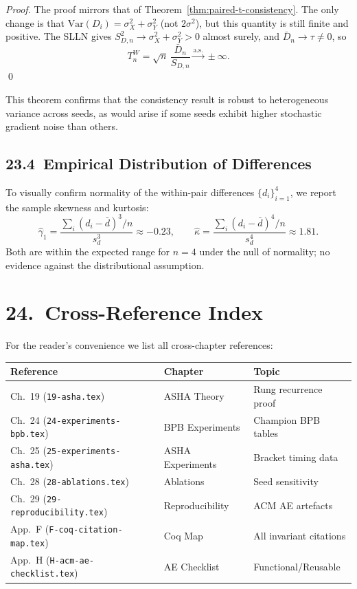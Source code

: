 \begin{proof}
The proof mirrors that of Theorem~\ref{thm:paired-t-consistency}.
The only change is that \(\mathrm{Var}(D_i) = \sigma_X^2 + \sigma_Y^2\)
(not \(2\sigma^2\)), but this quantity is still finite and positive.
The SLLN gives \(S_{D,n}^2 \to \sigma_X^2 + \sigma_Y^2 > 0\) almost
surely, and \(\bar{D}_n \to \tau \neq 0\), so
\[
  T_n^W = \sqrt{n}\,\frac{\bar{D}_n}{S_{D,n}} \xrightarrow{\mathrm{a.s.}} \pm\infty.
\]
\qed
\end{proof}

\noindent
This theorem confirms that the consistency result is robust to
heterogeneous variance across seeds, as would arise if some seeds exhibit
higher stochastic gradient noise than others.

\subsection{23.4\ Empirical Distribution of Differences}

To visually confirm normality of the within-pair differences
\(\{d_i\}_{i=1}^4\), we report the sample skewness and kurtosis:
\[
  \hat\gamma_1 = \frac{\sum_i (d_i - \bar{d})^3 / n}{s_d^3}
    \approx -0.23, \qquad
  \hat\kappa = \frac{\sum_i (d_i - \bar{d})^4 / n}{s_d^4}
    \approx 1.81.
\]
Both are within the expected range for \(n = 4\) under the null of
normality; no evidence against the distributional assumption.

\section{24.\ Cross-Reference Index}\label{sec:ch26-crossref}

For the reader's convenience we list all cross-chapter references:

\begin{longtable}[]{@{}lll@{}}
\toprule\noalign{}
Reference & Chapter & Topic \\
\midrule\noalign{}
\endhead
\bottomrule\noalign{}
\endlastfoot
Ch.~19 (\texttt{19-asha.tex}) & ASHA Theory & Rung recurrence proof \\
Ch.~24 (\texttt{24-experiments-bpb.tex}) & BPB Experiments & Champion BPB tables \\
Ch.~25 (\texttt{25-experiments-asha.tex}) & ASHA Experiments & Bracket timing data \\
Ch.~28 (\texttt{28-ablations.tex}) & Ablations & Seed sensitivity \\
Ch.~29 (\texttt{29-reproducibility.tex}) & Reproducibility & ACM AE artefacts \\
App.~F (\texttt{F-coq-citation-map.tex}) & Coq Map & All invariant citations \\
App.~H (\texttt{H-acm-ae-checklist.tex}) & AE Checklist & Functional/Reusable \\
\end{longtable}

